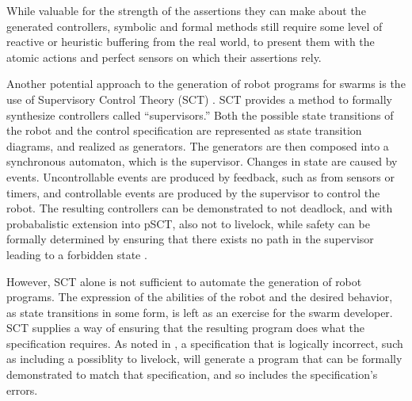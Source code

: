 While valuable for the strength of the assertions they can make about the generated controllers, symbolic and formal methods still require some level of reactive or heuristic buffering from the real world, to present them with the atomic actions and perfect sensors on which their assertions rely. 

Another potential approach to the generation of robot programs for swarms is the use of Supervisory Control Theory (SCT) \citep{lopes2016supervisory}.
SCT provides a method to formally synthesize controllers called ``supervisors.''
Both the possible state transitions of the robot and the control specification are represented as state transition diagrams, and realized as generators. 
The generators are then composed into a synchronous automaton, which is the supervisor. 
Changes in state are caused by events.
Uncontrollable events are produced by feedback, such as from sensors or timers, and controllable events are produced by the supervisor to control the robot. 
The resulting controllers can be demonstrated to not deadlock, and with probabalistic extension into pSCT, also not to livelock, while safety can be formally determined by ensuring that there exists no path in the supervisor leading to a forbidden state \citep{lopes2017probabilistic}. 

However, SCT alone is not sufficient to automate the generation of robot programs.
The expression of the abilities of the robot and the desired behavior, as state transitions in some form, is left as an exercise for the swarm developer. 
SCT supplies a way of ensuring that the resulting program does what the specification requires. 
As noted in \citep{lopes2017probabilistic}, a specification that is logically incorrect, such as including a possiblity to livelock, will generate a program that can be formally demonstrated to match that specification, and so includes the specification's errors. 

